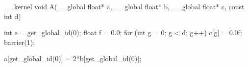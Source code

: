 __kernel void A(__global float* a,
                __global float* b,
                __global float* c,
                const int d) {
  int e = get_global_id(0);
  float f = 0.0;
  for (int g = 0; g < d; g++) {
    c[g] = 0.0f;
  }
  barrier(1);

  a[get_global_id(0)] = 2*b[get_global_id(0)];
}
